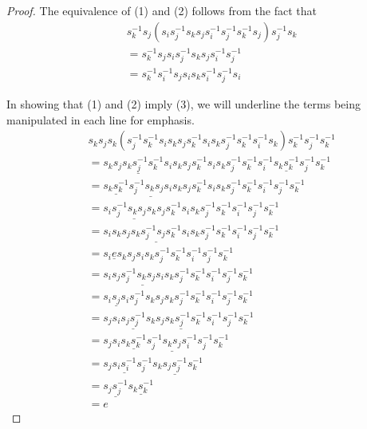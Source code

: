 \documentclass[11pt]{amsart}
\theoremstyle{definition}
\begin{document}
\begin{proof}
The equivalence of (1) and (2) follows from the fact that
\begin{align*}
& s_{k}^{-1}s_{j}(s_{i}s_{j}^{-1}s_{k}s_{j}s_{i}^{-1}s_{j}^{-1}s_{k}^{-1}s_{j})s_{j}^{-1}s_{k} \\
&= s_{k}^{-1}s_{j}s_{i}s_{j}^{-1}s_{k}s_{j}s_{i}^{-1}s_{j}^{-1} \\
&= s_{k}^{-1}s_{i}^{-1}s_{j}s_{i}s_{k}s_{i}^{-1}s_{j}^{-1}s_{i}
\end{align*}

In showing that (1) and (2) imply (3), we will underline the terms being manipulated in each line for emphasis.
\begin{align*}
& s_{k}s_{j}s_{k}(s_{j}^{-1}s_{k}^{-1}s_{i}s_{k}s_{j}s_{k}^{-1}s_{i}s_{k}s_{j}^{-1}s_{k}^{-1}s_{i}^{-1}s_{k})s_{k}^{-1}s_{j}^{-1}s_{k}^{-1} \\
&= s_{k}\underline{s_{j}s_{k}s_{j}^{-1}s_{k}^{-1}}s_{i}s_{k}s_{j}s_{k}^{-1}s_{i}s_{k}s_{j}^{-1}s_{k}^{-1}s_{i}^{-1}\underline{s_{k}s_{k}^{-1}}s_{j}^{-1}s_{k}^{-1} \\
&= \underline{s_{k}s_{k}^{-1}}\underline{s_{j}^{-1}s_{k}s_{j}s_{i}}s_{k}s_{j}s_{k}^{-1}s_{i}s_{k}s_{j}^{-1}s_{k}^{-1}s_{i}^{-1}s_{j}^{-1}s_{k}^{-1} \\
&= s_{i}\underline{s_{j}^{-1}s_{k}s_{j}s_{k}}s_{j}s_{k}^{-1}s_{i}s_{k}s_{j}^{-1}s_{k}^{-1}s_{i}^{-1}s_{j}^{-1}s_{k}^{-1} \\
&= s_{i}s_{k}s_{j}\underline{s_{k}s_{j}^{-1}s_{j}s_{k}^{-1}}s_{i}s_{k}s_{j}^{-1}s_{k}^{-1}s_{i}^{-1}s_{j}^{-1}s_{k}^{-1} \\
&= s_{i}\underline{e}s_{k}s_{j}s_{i}s_{k}s_{j}^{-1}s_{k}^{-1}s_{i}^{-1}s_{j}^{-1}s_{k}^{-1} \\
&= s_{i}s_{j}\underline{s_{j}^{-1}s_{k}s_{j}s_{i}}s_{k}s_{j}^{-1}s_{k}^{-1}s_{i}^{-1}s_{j}^{-1}s_{k}^{-1} \\
&= \underline{s_{i}s_{j}s_{i}}s_{j}^{-1}s_{k}s_{j}s_{k}s_{j}^{-1}s_{k}^{-1}s_{i}^{-1}s_{j}^{-1}s_{k}^{-1} \\
&= s_{j}s_{i}\underline{s_{j}s_{j}^{-1}}s_{k}\underline{s_{j}s_{k}s_{j}^{-1}s_{k}^{-1}}s_{i}^{-1}s_{j}^{-1}s_{k}^{-1} \\
&= s_{j}s_{i}\underline{s_{k}s_{k}^{-1}}\underline{s_{j}^{-1}s_{k}s_{j}s_{i}^{-1}}s_{j}^{-1}s_{k}^{-1} \\
&= s_{j}\underline{s_{i}s_{i}^{-1}}s_{j}^{-1}s_{k}\underline{s_{j}s_{j}^{-1}}s_{k}^{-1} \\
&= \underline{s_{j}s_{j}^{-1}}\underline{s_{k}s_{k}^{-1}} \\
&= e
\end{align*}
\end{proof}
\end{document}
